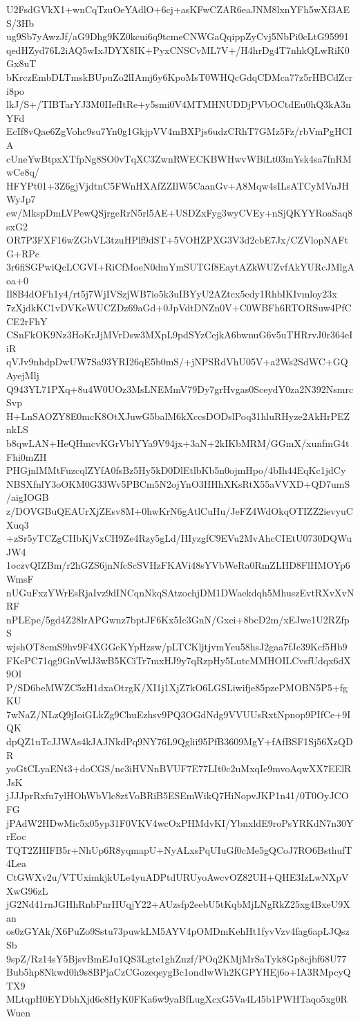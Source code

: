 U2FsdGVkX1+wnCqTzuOeYAdlO+6cj+asKFwCZAR6eaJNM8lxnYFh5wXf3AES/3Hb
ug9Sb7yAwzJf/aG9Dhg9KZ0kcui6q9tcmeCNWGaQqippZyCvj5NbPi0cLtG95991
qedHZyd76L2iAQ5wIxJDYX8IK+PyxCNSCvML7V+/H4hrDg4T7nhkQLwRiK0Gx8uT
bKrczEmbDLTmskBUpuZo2lIAmj6y6KpoMsT0WHQcGdqCDMca77z5rHBCdZcri8po
lkJ/S+/TIBTarYJ3M0IIefItRe+y5smi0V4MTMHNUDDjPVbOCtdEu0hQ3kA3nYFd
EcIf8vQae6ZgVohc9su7Yn0g1GkjpVV4mBXPjs6udzCRhT7GMz5Fz/rbVmPgHCIA
cUneYwBtpxXTfpNg8SO0vTqXC3ZwnRWECKBWHwvWBiLt03mYsk4sa7fnRMwCe8q/
HFYPt01+3Z6gjVjdtnC5FWnHXAfZZIlW5CaanGv+A8Mqw4sILsATCyMVnJHWyJp7
ew/MkspDmLVPewQSjrgeRrN5rl5AE+USDZxFyg3wyCVEy+nSjQKYYRoaSaq8sxG2
OR7P3FXF16wZGbVL3tzuHPlf9dST+5VOHZPXG3V3d2cbE7Jx/CZVlopNAFtG+RPc
3r6fiSGPwiQcLCGVI+RiCfMoeN0dmYmSUTGf8EaytAZkWUZvfAkYURcJMlgAoa+0
Il8B4dOFh1y4/rt5j7WjIVSzjWB7io5k3uIBYyU2AZtcx5cdy1RhbIKIvmloy23x
7zXjdkKC1vDVKeWUCZDz69aGd+0JpVdtDNZn0V+C0WBFh6RTORSuw4PfCCE2rFhY
CSnFkOK9Nz3HoKrJjMVrDsw3MXpL9pdSYzCejkA6bwnuG6v5uTHRrvJ0r364eIiR
qVJv9nhdpDwUW7Sa93YRI26qE5b0mS/+jNPSRdVhU05V+a2Ws2SdWC+GQAyejMlj
Q943YL71PXq+8u4W0UOz3MsLNEMmV79Dy7grHvgas0SceydY0za2N392NsmrcSvp
H+LnSAOZY8E0mcK8OtXJuwG5balM6kXccsDODslPoq31hluRHyze2AkHrPEZnkLS
b8qwLAN+HeQHmcvKGrVblYYa9V94jx+3aN+2kIKbMRM/GGmX/xunfmG4tFhi0mZH
PHGjnlMMtFuzcqlZYfA0fsBz5Hy5kD0DlEtlbKb5n0ojmHpo/4bIh44EqKc1jdCy
NBSXfnlY3oOKM0G33Wv5PBCm5N2ojYnO3HHhXKsRtX55aVVXD+QD7umS/aigIOGB
z/DOVGBuQEAUrXjZEsv8M+0hwKrN6gAtlCuHu/JeFZ4WdOkqOTIZZ2ievyuCXuq3
+zSr5yTCZgCHbKjVxCH9Ze4Rzy5gLd/HIyzgfC9EVu2MvAhcCIEtU0730DQWuJW4
1oczvQIZBm/r2hGZS6jnNfcScSVHzFKAVi48sYVbWeRa0RmZLHD8FlHMOYp6WmsF
nUGuFxzYWrEsRjaIvz9dINCqnNkqSAtzochjDM1DWaekdqh5MhuszEvtRXvXvNRF
nPLEpe/5gd4Z28lrAPGwnz7bptJF6Kx5Ic3GnN/Gxci+8bcD2m/xEJwe1U2RZfpS
wjshOT8emS9hv9F4XGGeKYpHzsw/pLTCKljtjvmYeu58hsJ2gaa7fJc39Kcf5Hb9
FKePC71qg9GnVwlJ3wB5KCiTr7mxHJ9y7qRzpHy5LutcMMHOILCvsfUdqx6dX9Ol
P/SD6beMWZC5zH1dxaOtrgK/XI1j1XjZ7kO6LGSLiwifje85pzePMOBN5P5+fgKU
7wNaZ/NLzQ9jIoiGLkZg9ChuEzhsv9PQ3OGdNdg9VVUUsRxtNpnop9PIfCe+9IQK
dpQZ1uTcJJWAs4kJAJNkdPq9NY76L9Qglii95PfB3609MgY+fAfBSF1Sj56XzQDR
yoGtCLyaENt3+doCGS/nc3iHVNnBVUF7E77LIt0c2uMxqIe9mvoAqwXX7EElRJsK
jJJJprRxfu7ylHOhWbVlc8ztVoBRiB5ESEmWikQ7HiNopvJKP1n41/0T0OyJCOFG
jPAdW2HDwMic5x05yp31F0VKV4wcOxPHMdvKI/YbnxldE9roPsYRKdN7n30YrEoc
TQT2ZHIFB5r+NhUp6R8yqmapU+NyALxsPqUIuGf0cMe5gQCoJ7RO6BsthufT4Lea
CtGWXv2u/VTUximkjkULe4yuADPtdURUyoAwcvOZ82UH+QHE3IzLwNXpVXwG96zL
jG2Nd41rnJGHhRnbPnrHUqjY22+AUzsfp2eebU5tKqbMjLNgRkZ25xg4BxeU9Xan
os0zGYAk/X6PuZo9Sstu73puwkLM5AYV4pOMDmKehHt1fyvVzv4fag6apLJQszSb
9spZ/Rz14sY5BjsvBmEJu1QS3Lgte1ghZnzf/POq2KMjMrSaTyk8Gp8cjbf68U77
Bub5hp8Nkwd0h9s8BPjaCzCGozeqeygBc1ondlwWh2KGPYHEj6o+IA3RMpcyQTX9
MLtqpH0EYDbhXjd6c8HyK0FKa6w9yaBfLugXcxG5Va4L45b1PWHTaqo5xg0RWuen
